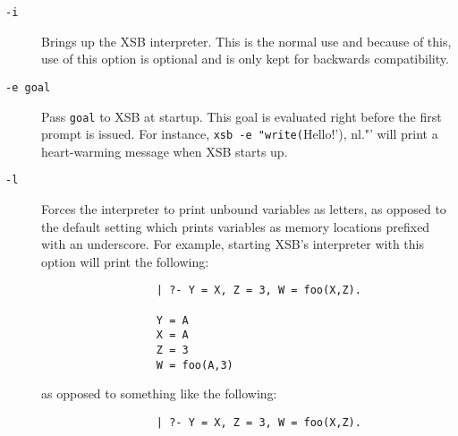 \begin{description}
\item[{\tt -i}] Brings up the XSB interpreter.  This is the normal use
        and because of this, use of this option is optional and is
        only kept for backwards compatibility.
\item[{\tt -e goal}] Pass {\tt goal}  to XSB at startup. This goal is evaluated
    right before the first prompt is issued. For instance, 
    \verb'xsb -e "write('Hello!'), nl."'
    will print a heart-warming message when XSB starts up.
\item[{\tt -l}] Forces the interpreter to print unbound variables as
	letters, as opposed to the default setting which prints
	variables as memory locations prefixed with an underscore.
	For example, starting XSB's interpreter with this option will
	print the following:
        \begin{verbatim}
                  | ?- Y = X, Z = 3, W = foo(X,Z).

                  Y = A
                  X = A
                  Z = 3
                  W = foo(A,3)
	\end{verbatim}
	as opposed to something like the following:
	\begin{verbatim}
                  | ?- Y = X, Z = 3, W = foo(X,Z).


\end{verbatim}
\end{description}
